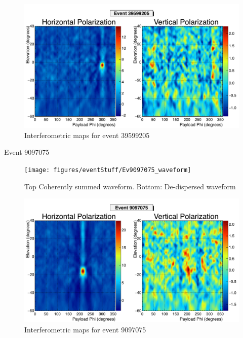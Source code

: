 		\begin{figure}
		\centering
			\includegraphics[width=\textwidth]{figures/intMap/intMap_ev39599205}
			\caption{Interferometric maps for event 39599205} 
		\label{fig:Ev39599205_map}
		\end{figure}				
		
	
			Event 9097075 
		
		\begin{figure}
		\centering
			\texttt{[image: figures/eventStuff/Ev9097075\_waveform]}
			\caption{Top Coherently summed waveform.  Bottom: De-dispersed waveform} 
		\label{fig:Ev9097075_waveform}
		\end{figure}

		\begin{figure}
		\centering
			\includegraphics[width=\textwidth]{figures/intMap/intMap_ev9097075}
			\caption{Interferometric maps for event 9097075} 
		\label{fig:Ev9097075_map}
		\end{figure}

